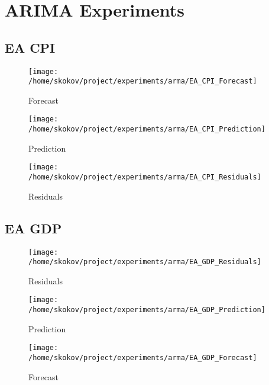 \chapter{ARIMA Experiments}%
\section{EA CPI}%


\begin{figure}[h!]%
\centering%
\texttt{[image: /home/skokov/project/experiments/arma/EA\_CPI\_Forecast]}%
\caption{Forecast}%
\label{fig:EA_CPI_Forecast}%
\end{figure}

%


\begin{figure}[h!]%
\centering%
\texttt{[image: /home/skokov/project/experiments/arma/EA\_CPI\_Prediction]}%
\caption{Prediction}%
\label{fig:EA_CPI_Prediction}%
\end{figure}

%


\begin{figure}[h!]%
\centering%
\texttt{[image: /home/skokov/project/experiments/arma/EA\_CPI\_Residuals]}%
\caption{Residuals}%
\label{fig:EA_CPI_Residuals}%
\end{figure}

%
\section{EA GDP}%


\begin{figure}[h!]%
\centering%
\texttt{[image: /home/skokov/project/experiments/arma/EA\_GDP\_Residuals]}%
\caption{Residuals}%
\label{fig:EA_GDP_Residuals}%
\end{figure}

%


\begin{figure}[h!]%
\centering%
\texttt{[image: /home/skokov/project/experiments/arma/EA\_GDP\_Prediction]}%
\caption{Prediction}%
\label{fig:EA_GDP_Prediction}%
\end{figure}

%


\begin{figure}[h!]%
\centering%
\texttt{[image: /home/skokov/project/experiments/arma/EA\_GDP\_Forecast]}%
\caption{Forecast}%
\label{fig:EA_GDP_Forecast}%
\end{figure}

